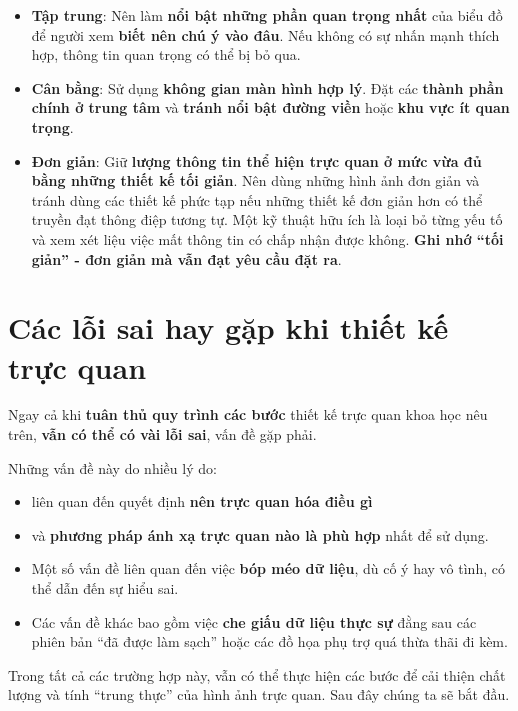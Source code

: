 \begin{itemize}
\tightlist
\item
  \textbf{Tập trung}: Nên làm \textbf{nổi bật những phần quan trọng
  nhất} của biểu đồ để người xem \textbf{biết nên chú ý vào đâu}. Nếu
  không có sự nhấn mạnh thích hợp, thông tin quan trọng có thể bị bỏ
  qua.
\item
  \textbf{Cân bằng}: Sử dụng \textbf{không gian màn hình hợp lý}. Đặt
  các \textbf{thành phần chính ở trung tâm} và \textbf{tránh nổi bật
  đường viền} hoặc \textbf{khu vực ít quan trọng}.
\item
  \textbf{Đơn giản}: Giữ \textbf{lượng thông tin thể hiện trực quan ở
  mức vừa đủ bằng những thiết kế tối giản}. Nên dùng những hình ảnh đơn
  giản và tránh dùng các thiết kế phức tạp nếu những thiết kế đơn giản
  hơn có thể truyền đạt thông điệp tương tự. Một kỹ thuật hữu ích là
  loại bỏ từng yếu tố và xem xét liệu việc mất thông tin có chấp nhận
  được không. \textbf{Ghi nhớ ``tối giản'' - đơn giản mà vẫn đạt yêu cầu
  đặt ra}.
\end{itemize}

\section{Các lỗi sai hay gặp khi thiết kế trực
quan}\label{cuxe1c-lux1ed7i-sai-hay-gux1eb7p-khi-thiux1ebft-kux1ebf-trux1ef1c-quan}

Ngay cả khi \textbf{tuân thủ quy trình các bước} thiết kế trực quan khoa
học nêu trên, \textbf{vẫn có thể có vài lỗi sai}, vấn đề gặp phải.

Những vấn đề này do nhiều lý do:

\begin{itemize}
\tightlist
\item
  liên quan đến quyết định \textbf{nên trực quan hóa điều gì}
\item
  và \textbf{phương pháp ánh xạ trực quan nào là phù hợp} nhất để sử
  dụng.
\item
  Một số vấn đề liên quan đến việc \textbf{bóp méo dữ liệu}, dù cố ý hay
  vô tình, có thể dẫn đến sự hiểu sai.
\item
  Các vấn đề khác bao gồm việc \textbf{che giấu dữ liệu thực sự} đằng
  sau các phiên bản ``đã được làm sạch'' hoặc các đồ họa phụ trợ quá
  thừa thãi đi kèm.
\end{itemize}

Trong tất cả các trường hợp này, vẫn có thể thực hiện các bước để cải
thiện chất lượng và tính ``trung thực'' của hình ảnh trực quan. Sau đây
chúng ta sẽ bắt đầu.


